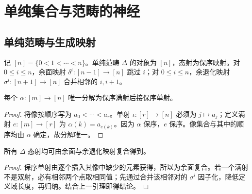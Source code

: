 \chapter{单纯集合与范畴的神经}
\section{单纯范畴与生成映射}
\begin{definition}[单纯范畴]
记 $[n]=\{0<1<\cdots<n\}$。单纯范畴 $\Delta$ 的对象为 $[n]$，态射为保序映射。对 $0\le i\le n$，余面映射 $\delta^i:[n-1]\to[n]$ 跳过 $i$；对 $0\le i\le n$，余退化映射 $\sigma^i:[n+1]\to[n]$ 合并相邻的 $i,i+1$。
\end{definition}
\begin{lemma}[保序映射的分解]
每个 $\alpha:[m]\to[n]$ 唯一分解为保序满射后接保序单射。
\end{lemma}
\begin{proof}
将像按顺序写为 $a_0<\cdots<a_r$。单射 $\iota:[r]\to[n]$ 必须为 $j\mapsto a_j$；定义满射 $e:[m]\to[r]$ 为 $\alpha(k)=a_{e(k)}$。因为 $\alpha$ 保序，$e$ 保序。像集合与其中的顺序均由 $\alpha$ 确定，故分解唯一。
\end{proof}
\begin{proposition}
所有 $\Delta$ 态射均可由余面与余退化映射复合得到。
\end{proposition}
\begin{proof}
保序单射由逐个插入其像中缺少的元素获得，所以为余面复合。若一个满射不是双射，必有相邻两个点取相同值；先通过合并该相邻对的 $\sigma^i$ 因子化，降低定义域长度，再归纳。结合上一引理即得结论。
\end{proof}


